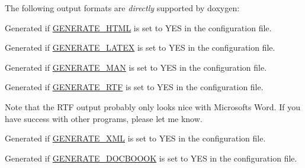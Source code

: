 
The following output formats are {\itshape directly} supported by doxygen\+: 
\begin{DoxyDescription}
\item[{\bfseries{H\+T\+ML}} ]Generated if \mbox{\hyperlink{config_cfg_generate_html}{G\+E\+N\+E\+R\+A\+T\+E\+\_\+\+H\+T\+ML}} is set to {\ttfamily Y\+ES} in the configuration file. 
\item[]Generated if \mbox{\hyperlink{config_cfg_generate_latex}{G\+E\+N\+E\+R\+A\+T\+E\+\_\+\+L\+A\+T\+EX}} is set to {\ttfamily Y\+ES} in the configuration file. 
\item[{\bfseries{Man pages}} ]Generated if \mbox{\hyperlink{config_cfg_generate_man}{G\+E\+N\+E\+R\+A\+T\+E\+\_\+\+M\+AN}} is set to {\ttfamily Y\+ES} in the configuration file. 
\item[{\bfseries{R\+TF}} ]Generated if \mbox{\hyperlink{config_cfg_generate_rtf}{G\+E\+N\+E\+R\+A\+T\+E\+\_\+\+R\+TF}} is set to {\ttfamily Y\+ES} in the configuration file.

Note that the R\+TF output probably only looks nice with Microsoft\textquotesingle{}s Word. If you have success with other programs, please let me know. 
\item[{\bfseries{X\+ML}} ]Generated if \mbox{\hyperlink{config_cfg_generate_xml}{G\+E\+N\+E\+R\+A\+T\+E\+\_\+\+X\+ML}} is set to {\ttfamily Y\+ES} in the configuration file.


\item[{\bfseries{Doc\+Book}} ]Generated if \mbox{\hyperlink{config_cfg_generate_docbook}{G\+E\+N\+E\+R\+A\+T\+E\+\_\+\+D\+O\+C\+B\+O\+O\+OK}} is set to {\ttfamily Y\+ES} in the configuration file.


\end{DoxyDescription}

